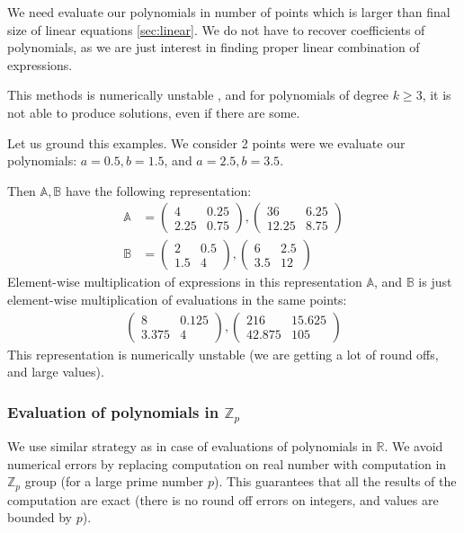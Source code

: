 We need evaluate our polynomials in number of points which is larger 
than final size of linear equations \ref{sec:linear}. We do not have to recover coefficients of polynomials,
as we are just interest in finding proper linear combination of expressions.


This methods is numerically unstable
, and for polynomials of degree $k \geq 3$, it is not able to produce solutions, even if there are some.


Let us ground this examples. We consider 2 points were we evaluate our polynomials:
$a = 0.5, b = 1.5$, and $a = 2.5, b = 3.5$.

Then $\mathbb{A}, \mathbb{B}$ have the following representation:
\begin{align*}
\mathbb{A} &= \begin{pmatrix} 4 & 0.25\\ 2.25 & 0.75 \end{pmatrix}, \begin{pmatrix} 36 & 6.25\\ 12.25 & 8.75 \end{pmatrix} \\
\mathbb{B} &= \begin{pmatrix} 2 & 0.5\\ 1.5 & 4 \end{pmatrix}, \begin{pmatrix} 6 & 2.5\\ 3.5 & 12 \end{pmatrix}
\end{align*}
Element-wise multiplication of expressions in this representation $\mathbb{A}$, and $\mathbb{B}$ is just element-wise multiplication of evaluations
in the same points:
\begin{align*}
\begin{pmatrix} 8 & 0.125\\ 3.375 & 4 \end{pmatrix}, \begin{pmatrix} 216 & 15.625\\ 42.875 & 105 \end{pmatrix}
\end{align*}
This representation is numerically unstable (we are getting a lot of round offs, and large values).

\subsubsection{Evaluation of polynomials in $\mathbb{Z}_p$}
We use similar strategy as in case of evaluations of polynomials in $\mathbb{R}$. 
We avoid numerical errors by replacing computation on real number with computation in $\mathbb{Z}_p$ group (for a large prime number $p$). This
guarantees that all the results of the computation are exact (there is no round off errors on integers, and values are bounded by $p$). 

